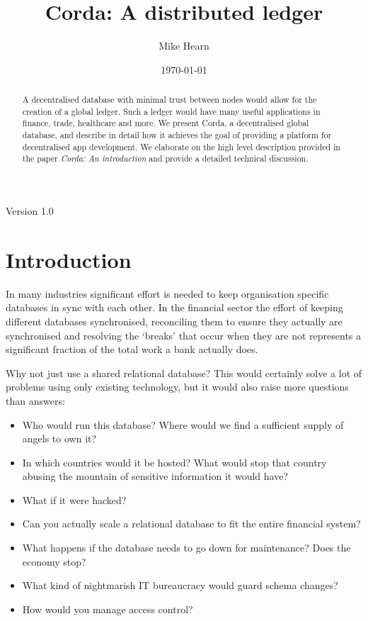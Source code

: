 \documentclass{article}
\author{Mike Hearn}
\date{\today}
\title{Corda: A distributed ledger}
\begin{document}
\maketitle
\begin{center}
Version 1.0
\end{center}

\vspace{10mm}

\begin{abstract}

A decentralised database with minimal trust between nodes would allow for the creation of a global ledger. Such a ledger
would have many useful applications in finance, trade, healthcare and more. We present Corda, a decentralised
global database, and describe in detail how it achieves the goal of providing a platform for decentralised app
development. We elaborate on the high level description provided in the paper \emph{Corda: An
introduction}\cite{CordaIntro} and provide a detailed technical discussion.

\end{abstract}
\vfill

\newpage
\tableofcontents
\newpage
\section{Introduction}

In many industries significant effort is needed to keep organisation specific databases in sync with each other. In
the financial sector the effort of keeping different databases synchronised, reconciling them to ensure they
actually are synchronised and resolving the `breaks' that occur when they are not represents a significant fraction
of the total work a bank actually does.

Why not just use a shared relational database? This would certainly solve a lot of problems using only existing
technology, but it would also raise more questions than answers:

\begin{itemize}
\item Who would run this database? Where would we find a sufficient supply of angels to own it?
\item In which countries would it be hosted? What would stop that country abusing the mountain of sensitive information it would have?
\item What if it were hacked?
\item Can you actually scale a relational database to fit the entire financial system?
\item What happens if the database needs to go down for maintenance? Does the economy stop?
\item What kind of nightmarish IT bureaucracy would guard schema changes?
\item How would you manage access control?
\end{itemize}
\end{document}
